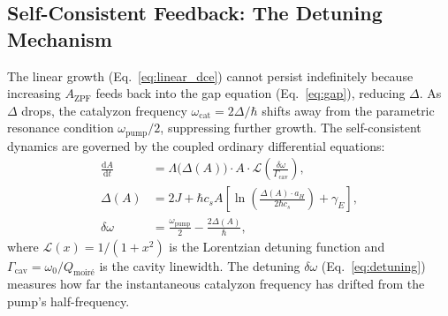 \documentclass[11pt,letterpaper]{article}
\begin{document}
\subsection{Self-Consistent Feedback: The Detuning Mechanism}

The linear growth (Eq.~\ref{eq:linear_dce}) cannot persist indefinitely because increasing $A_{\text{ZPF}}$ feeds back into the gap equation (Eq.~\ref{eq:gap}), reducing $\Delta$. As $\Delta$ drops, the catalyzon frequency $\omega_{\text{cat}} = 2\Delta/\hbar$ shifts away from the parametric resonance condition $\omega_{\text{pump}}/2$, suppressing further growth. The self-consistent dynamics are governed by the coupled ordinary differential equations:
\begin{align}
\frac{\mathrm{d}A}{\mathrm{d}t} &= \Lambda\bigl(\Delta(A)\bigr) \cdot A \cdot \mathcal{L}\!\left(\frac{\delta\omega}{\Gamma_{\text{cav}}}\right), \label{eq:coupled_A} \\
\Delta(A) &= 2J + \hbar c_s A \left[\ln\!\left(\frac{\Delta(A) \cdot a_H}{2\hbar c_s}\right) + \gamma_E\right], \label{eq:coupled_gap} \\
\delta\omega &= \frac{\omega_{\text{pump}}}{2} - \frac{2\Delta(A)}{\hbar}, \label{eq:detuning}
\end{align}
where $\mathcal{L}(x) = 1/(1+x^2)$ is the Lorentzian detuning function and $\Gamma_{\text{cav}} = \omega_0 / Q_{\text{moir\'{e}}}$ is the cavity linewidth. The detuning $\delta\omega$ (Eq.~\ref{eq:detuning}) measures how far the instantaneous catalyzon frequency has drifted from the pump's half-frequency.
\end{document}
